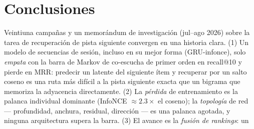 \documentclass[11pt]{article}
\begin{document}
\section{Conclusiones}
\label{sec:conclusions}
Veintiuna campañas y un memorándum de investigación (jul--ago 2026) sobre la
tarea de recuperación de pista siguiente
convergen en una historia clara. (1) Un modelo de secuencias de sesión, incluso
en su mejor forma (GRU-infonce), solo \emph{empata} con la barra de Markov de
co-escucha de primer orden en recall@10 y pierde en MRR: predecir un latente del
siguiente ítem y recuperar por un salto coseno es una ruta más difícil a la
pista siguiente exacta que un bigrama que memoriza la adyacencia directamente.
(2) La \emph{pérdida} de entrenamiento es la palanca individual dominante
(InfoNCE $\approx 2.3\times$ el coseno); la \emph{topología} de red ---
profundidad, anchura, residual, dirección --- es una palanca agotada, y ninguna
arquitectura supera la barra. (3) El avance es la \emph{fusión de rankings}: un
\end{document}
